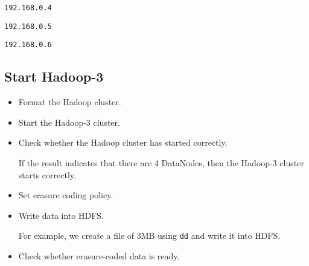 \documentclass[letterpaper,12pt]{article}
\begin{document}
\begin{itemize}
\begin{center}
{{    {\tt 192.168.0.4}

    {\tt 192.168.0.5}

    {\tt 192.168.0.6}
    }%
}
\end{center}

\subsection{Start Hadoop-3}

\begin{itemize}

\item Format the Hadoop cluster.

\noindent{}

\item Start the Hadoop-3 cluster.

\noindent{}

\item Check whether the Hadoop cluster has started correctly.

\noindent{}

If the result indicates that there are 4 DataNodes, then the Hadoop-3 cluster
starts correctly.

\item Set erasure coding policy.

\noindent{}

\item Write data into HDFS.

For example, we create a file of 3MB using {\tt dd} and write it into HDFS.

\noindent{}

\item Check whether erasure-coded data is ready.


\end{itemize}
\end{itemize}
\end{document}
